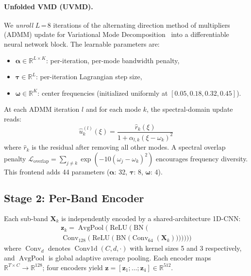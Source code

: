 \documentclass[conference]{IEEEtran}
\newcommand{\uvmd}{\textsc{UVMD}}
\begin{document}
\paragraph{Unfolded VMD (\uvmd{}).}
We \emph{unroll} $L$\,=\,8 iterations of the alternating direction method of multipliers (ADMM) update for Variational Mode Decomposition~\cite{dragomiretskiy2014variational} into a differentiable neural network block.
The learnable parameters are:
\begin{itemize}
    \item $\boldsymbol{\alpha} \in \mathbb{R}^{L \times K}$: per-iteration, per-mode bandwidth penalty,
    \item $\boldsymbol{\tau} \in \mathbb{R}^{L}$: per-iteration Lagrangian step size,
    \item $\boldsymbol{\omega} \in \mathbb{R}^{K}$: center frequencies (initialized uniformly at $[0.05, 0.18, 0.32, 0.45]$).
\end{itemize}
At each ADMM iteration $l$ and for each mode $k$, the spectral-domain update reads:
\begin{equation}
\hat{u}_k^{(l)}(\xi) = \frac{\hat{r}_k(\xi)}{1 + \alpha_{l,k} (\xi - \omega_k)^2}
\label{eq:uvmd}
\end{equation}
where $\hat{r}_k$ is the residual after removing all other modes.
A spectral overlap penalty $\mathcal{L}_{\mathrm{overlap}} = \sum_{j \neq k} \exp(-10(\omega_j - \omega_k)^2)$ encourages frequency diversity.
This frontend adds 44 parameters ($\boldsymbol{\alpha}$: 32, $\boldsymbol{\tau}$: 8, $\boldsymbol{\omega}$: 4).

\subsection{Stage 2: Per-Band Encoder}
Each sub-band $\mathbf{X}_k$ is independently encoded by a shared-architecture 1D-CNN:
\begin{multline}
\mathbf{z}_k = \operatorname{AvgPool}\!\big(\operatorname{ReLU}\!\big(\operatorname{BN}\!\big( \\
\operatorname{Conv}_{128}\!\big(\operatorname{ReLU}\!\big(\operatorname{BN}\!\big(\operatorname{Conv}_{64}(\mathbf{X}_k)\big)\big)\big)\big)\big)\big)
\end{multline}
where $\operatorname{Conv}_{d}$ denotes $\operatorname{Conv1d}(C, d, \cdot)$ with kernel sizes 5 and 3 respectively, and $\operatorname{AvgPool}$ is global adaptive average pooling.
Each encoder maps $\mathbb{R}^{T \times C} \to \mathbb{R}^{128}$; four encoders yield $\mathbf{z} = [\mathbf{z}_1; \ldots; \mathbf{z}_4] \in \mathbb{R}^{512}$.
\end{document}
